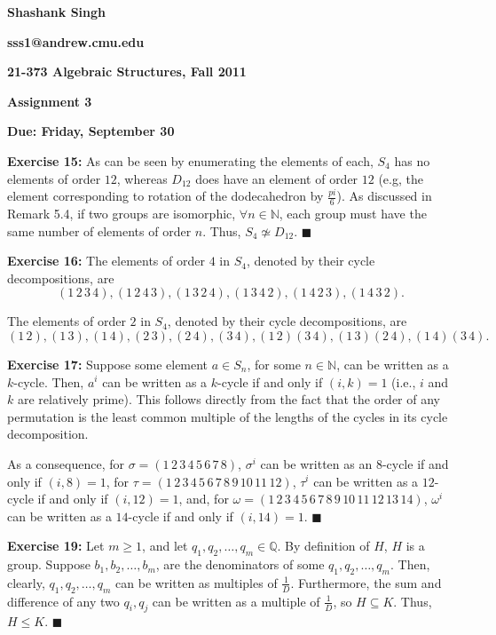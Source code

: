 \documentclass{article}%
\begin{document}
\begin{center}
\textbf{Shashank Singh}

\textbf{sss1@andrew.cmu.edu}

\textbf{21-373 \quad Algebraic Structures, Fall 2011}

\textbf{Assignment 3}

\textbf{Due: Friday, September 30}\\
\end{center}

\textbf{Exercise 15:} As can be seen by enumerating the elements of each, $S_4$
has no elements of order $12$, whereas $D_{12}$ does have an element of order
$12$ (e.g, the element corresponding to rotation of the dodecahedron by
$\frac{pi}{6}$). As discussed in Remark 5.4, if two groups are isomorphic,
$\forall n \in \mathbb{N}$, each group must have the same number of elements of
order $n$. Thus, $S_4 \not \simeq D_12$. \qquad $\blacksquare$

\textbf{Exercise 16:} The elements of order $4$ in $S_4$, denoted by their
cycle decompositions, are \[(1 \, 2\, 3 \, 4), (1 \, 2 \, 4 \, 3),
(1 \, 3 \, 2 \, 4), (1 \, 3 \, 4 \, 2), (1 \, 4 \, 2 \, 3),
(1 \, 4 \, 3 \, 2).\]

The elements of order $2$ in $S_4$, denoted by their
cycle decompositions, are \[(1 \, 2), (1 \, 3), (1 \, 4), (2 \, 3), (2 \, 4),
(3 \, 4), (1 \, 2) (3 \, 4), (1 \, 3) (2 \, 4), (1 \, 4) (3 \, 4).\]


\textbf{Exercise 17:} Suppose some element $a \in S_n$, for some $n \in
\mathbb{N}$, can be written as a $k$-cycle. Then, $a^i$ can be written as a
$k$-cycle if and only if $(i,k) = 1$ (i.e., $i$ and $k$ are relatively prime).
This follows directly from the fact that the order of any permutation is the
least common multiple of the lengths of the cycles in its cycle decomposition.

As a consequence, for $\sigma = (1 \, 2 \, 3 \, 4 \, 5 \, 6 \, 7 \, 8)$,
$\sigma^i$ can be written as an $8$-cycle if and only if $(i,8) = 1$, for
$\tau = (1 \, 2 \, 3 \, 4 \, 5 \, 6 \, 7 \, 8 \, 9 \, 10 \, 11 \, 12)$,
$\tau^i$ can be written as a $12$-cycle if and only if $(i,12) = 1$, and, for
$\omega = (1 \, 2 \, 3 \, 4 \, 5 \, 6 \, 7 \, 8 \, 9 \, 10 \, 11 \, 12 \, 13
\, 14)$, $\omega^i$ can be written as a $14$-cycle if and only if $(i,14) =
1$. \qquad $\blacksquare$

\textbf{Exercise 19:} Let $m \geq 1$, and let $q_1, q_2, \ldots, q_m \in
\mathbb{Q}$. By definition of $H$, $H$ is a group. Suppose $b_1, b_2, \ldots,
b_m$, are the denominators of some $q_1, q_2, \ldots, q_m$. Then, clearly,
$q_1, q_2, \ldots, q_m$ can be written as multiples of $\frac{1}{D}$.
Furthermore, the sum and difference of any two $q_i, q_j$ can be written as
a multiple of $\frac{1}{D}$, so $H \subseteq K$. Thus, $H \leq K$.
\qquad $\blacksquare$
\end{document}
